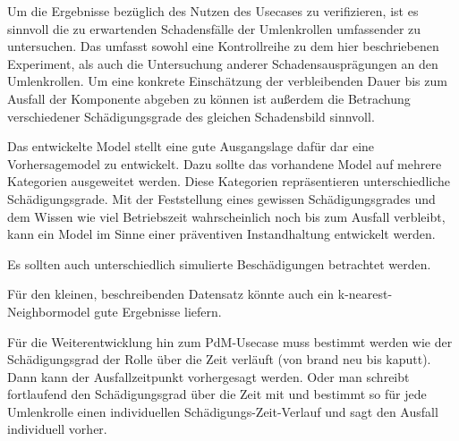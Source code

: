 Um die Ergebnisse bezüglich des Nutzen des Usecases zu verifizieren, ist es sinnvoll die zu erwartenden Schadensfälle der Umlenkrollen umfassender zu untersuchen. Das umfasst sowohl eine Kontrollreihe zu dem hier beschriebenen Experiment, als auch die Untersuchung anderer Schadensausprägungen an den Umlenkrollen. Um eine konkrete Einschätzung der verbleibenden Dauer bis zum Ausfall der Komponente abgeben zu können ist außerdem die Betrachung verschiedener Schädigungsgrade des gleichen Schadensbild sinnvoll. 

Das entwickelte Model stellt eine gute Ausgangslage dafür dar eine Vorhersagemodel zu entwickelt. Dazu sollte das vorhandene Model auf mehrere Kategorien ausgeweitet werden. Diese Kategorien repräsentieren unterschiedliche Schädigungsgrade. Mit der Feststellung eines gewissen Schädigungsgrades und dem Wissen wie viel Betriebszeit wahrscheinlich noch bis zum Ausfall verbleibt, kann ein Model im Sinne einer präventiven Instandhaltung entwickelt werden.

Es sollten auch unterschiedlich simulierte Beschädigungen betrachtet werden.

Für den kleinen, beschreibenden Datensatz könnte auch ein k-nearest-Neighbormodel gute Ergebnisse liefern.

Für die Weiterentwicklung hin zum PdM-Usecase muss bestimmt werden wie der Schädigungsgrad der Rolle über die Zeit verläuft (von brand neu bis kaputt). Dann kann der Ausfallzeitpunkt vorhergesagt werden.
Oder man schreibt fortlaufend den Schädigungsgrad über die Zeit mit und bestimmt so für jede Umlenkrolle einen individuellen Schädigungs-Zeit-Verlauf und sagt den Ausfall individuell vorher.